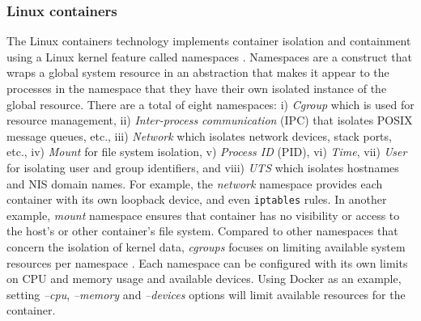 \documentclass[english, 12pt, a4paper, sci, utf8, a-2b, online]{aaltothesis}
\begin{document}
\subsubsection{Linux containers}

The Linux containers technology implements container isolation and containment using a Linux kernel feature called namespaces \cite{lin2018measurement}. Namespaces \cite{manpages-namespace} are a construct that wraps a global system resource in an abstraction that makes it appear to the processes in the namespace that they have their own isolated instance of the global resource. There are a total of eight namespaces: i) \textit{Cgroup} which is used for resource management, ii) \textit{Inter-process communication} (IPC) that isolates POSIX message queues, etc., iii) \textit{Network} which isolates network devices, stack ports, etc., iv) \textit{Mount} for file system isolation, v) \textit{Process ID} (PID), vi) \textit{Time}, vii) \textit{User} for isolating user and group identifiers, and viii) \textit{UTS} which isolates hostnames and NIS domain names. For example, the \textit{network} namespace provides each container with its own loopback device, and even \texttt{iptables} rules. In another example, \textit{mount} namespace ensures that container has no visibility or access to the host's or other container's file system. Compared to other namespaces that concern the isolation of kernel data, \textit{cgroups} focuses on limiting available system resources per namespace \cite{lin2018measurement}. Each namespace can be configured with its own limits on CPU and memory usage and available devices. Using Docker as an example, setting \textit{--cpu}, \textit{--memory} and \textit{--devices} options will limit available resources for the container.
\end{document}

